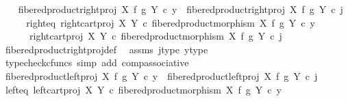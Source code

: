 \begin{isabellebody}
\ \ \isamarkupfalse%
\ {\isachardoublequoteopen}fibered{\isacharunderscore}{\kern0pt}product{\isacharunderscore}{\kern0pt}right{\isacharunderscore}{\kern0pt}proj\ X\ f\ g\ Y\ {\isasymcirc}\isactrlsub c\ y\ {\isacharequal}{\kern0pt}\ fibered{\isacharunderscore}{\kern0pt}product{\isacharunderscore}{\kern0pt}right{\isacharunderscore}{\kern0pt}proj\ X\ f\ g\ Y\ {\isasymcirc}\isactrlsub c\ j{\isachardoublequoteclose}\isanewline
\ \ \isamarkupfalse%
\ \isamarkupfalse%
\ right{\isacharunderscore}{\kern0pt}eq{\isacharcolon}{\kern0pt}\ {\isachardoublequoteopen}right{\isacharunderscore}{\kern0pt}cart{\isacharunderscore}{\kern0pt}proj\ X\ Y\ {\isasymcirc}\isactrlsub c\ {\isacharparenleft}{\kern0pt}fibered{\isacharunderscore}{\kern0pt}product{\isacharunderscore}{\kern0pt}morphism\ X\ f\ g\ Y\ {\isasymcirc}\isactrlsub c\ y{\isacharparenright}{\kern0pt}\ {\isacharequal}{\kern0pt}\isanewline
\ \ \ \ \ \ right{\isacharunderscore}{\kern0pt}cart{\isacharunderscore}{\kern0pt}proj\ X\ Y\ {\isasymcirc}\isactrlsub c\ {\isacharparenleft}{\kern0pt}fibered{\isacharunderscore}{\kern0pt}product{\isacharunderscore}{\kern0pt}morphism\ X\ f\ g\ Y\ {\isasymcirc}\isactrlsub c\ j{\isacharparenright}{\kern0pt}{\isachardoublequoteclose}\isanewline
\ \ \ \ \isamarkupfalse%
\ fibered{\isacharunderscore}{\kern0pt}product{\isacharunderscore}{\kern0pt}right{\isacharunderscore}{\kern0pt}proj{\isacharunderscore}{\kern0pt}def\ \isamarkupfalse%
\ assms\ j{\isacharunderscore}{\kern0pt}type\ y{\isacharunderscore}{\kern0pt}type\isanewline
\ \ \ \ \isamarkupfalse%
\ {\isacharparenleft}{\kern0pt}typecheck{\isacharunderscore}{\kern0pt}cfuncs{\isacharcomma}{\kern0pt}\ simp\ add{\isacharcolon}{\kern0pt}\ comp{\isacharunderscore}{\kern0pt}associative{}{\isacharparenright}{\kern0pt}\isanewline
\ \ \isamarkupfalse%
\ {\isachardoublequoteopen}fibered{\isacharunderscore}{\kern0pt}product{\isacharunderscore}{\kern0pt}left{\isacharunderscore}{\kern0pt}proj\ X\ f\ g\ Y\ {\isasymcirc}\isactrlsub c\ y\ {\isacharequal}{\kern0pt}\ fibered{\isacharunderscore}{\kern0pt}product{\isacharunderscore}{\kern0pt}left{\isacharunderscore}{\kern0pt}proj\ X\ f\ g\ Y\ {\isasymcirc}\isactrlsub c\ j{\isachardoublequoteclose}\isanewline
\ \ \isamarkupfalse%
\ \isamarkupfalse%
\ left{\isacharunderscore}{\kern0pt}eq{\isacharcolon}{\kern0pt}\ {\isachardoublequoteopen}left{\isacharunderscore}{\kern0pt}cart{\isacharunderscore}{\kern0pt}proj\ X\ Y\ {\isasymcirc}\isactrlsub c\ {\isacharparenleft}{\kern0pt}fibered{\isacharunderscore}{\kern0pt}product{\isacharunderscore}{\kern0pt}morphism\ X\ f\ g\ Y\ {\isasymcirc}\isactrlsub c\ y{\isacharparenright}{\kern0pt}\ {\isacharequal}{\kern0pt}\isanewline

\end{isabellebody}
